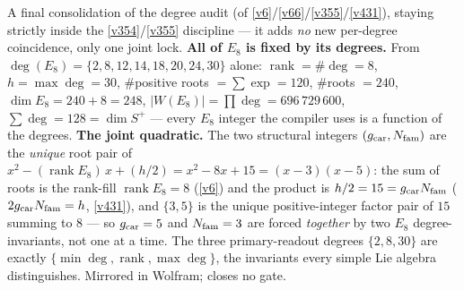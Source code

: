\begin{winbox}
A final consolidation of the degree audit (of \vref{v6}/\vref{v66}/\vref{v355}/\vref{v431}), staying strictly inside the \vref{v354}/\vref{v355} discipline --- it adds \emph{no} new per-degree coincidence, only one joint lock. \textbf{All of $E_8$ is fixed by its degrees.} From $\deg(E_8)=\{2,8,12,14,18,20,24,30\}$ alone: $\operatorname{rank}=\#\deg=8$, $h=\max\deg=30$, $\#$positive roots $=\sum\exp=120$, $\#$roots $=240$, $\dim E_8=240+8=248$, $|W(E_8)|=\prod\deg=696\,729\,600$, $\sum\deg=128=\dim S^+$ --- every $E_8$ integer the compiler uses is a function of the degrees. \textbf{The joint quadratic.} The two structural integers $(g_{\mathrm{car}},N_{\mathrm{fam}})$ are the \emph{unique} root pair of $x^2-(\operatorname{rank}E_8)\,x+(h/2)=x^2-8x+15=(x-3)(x-5)$: the sum of roots is the rank-fill $\operatorname{rank}E_8=8$ (\vref{v6}) and the product is $h/2=15=g_{\mathrm{car}}N_{\mathrm{fam}}$ ($2g_{\mathrm{car}}N_{\mathrm{fam}}=h$, \vref{v431}), and $\{3,5\}$ is the unique positive-integer factor pair of $15$ summing to $8$ --- so $g_{\mathrm{car}}=5$ and $N_{\mathrm{fam}}=3$ are forced \emph{together} by two $E_8$ degree-invariants, not one at a time. The three primary-readout degrees $\{2,8,30\}$ are exactly $\{\min\deg,\operatorname{rank},\max\deg\}$, the invariants every simple Lie algebra distinguishes. Mirrored in Wolfram; closes no gate.
\end{winbox}

